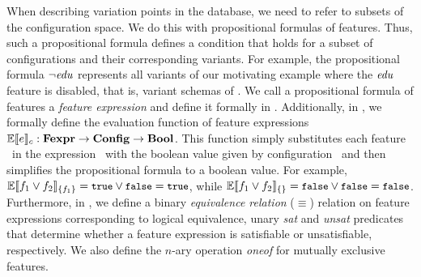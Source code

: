 When describing variation points in the database, we need to 
refer to subsets of the configuration space. We do this with
propositional formulas of features.
Thus, 
such a propositional formula defines a condition that holds for 
a subset of configurations and their corresponding variants. 
%
%
For example, the propositional formula $\neg \edu$ represents all variants of
our motivating example where the $\edu$ feature is disabled, that is, variant
schemas of . 
%
We call a propositional formula of features a \emph{feature expression} and define
it formally in . 
Additionally, in , we formally define the evaluation function of feature expressions
$\fSem \dimMeta : \ffSet \to \confSet \to \bSet$. This function simply substitutes each
feature \fName\ in the expression \dimMeta\ with the boolean value 
given by configuration \config\ and then
simplifies the propositional formula to a boolean value.
For example, 
$\fSem [\{\A\}] {\A \vee \B} = \t \vee \f = \t$, while
$\fSem [\{\}] {\A \vee \B} = \f \vee \f = \f$.
Furthermore, in , we define a binary \emph{equivalence
relation} ($\equiv$) relation on feature expressions corresponding to logical
equivalence, unary \emph{sat} and \emph{unsat} predicates that determine
whether a feature expression is satisfiable or unsatisfiable, respectively.
We also define the $\mathit{n}$-ary operation \emph{oneof} for mutually exclusive features.
